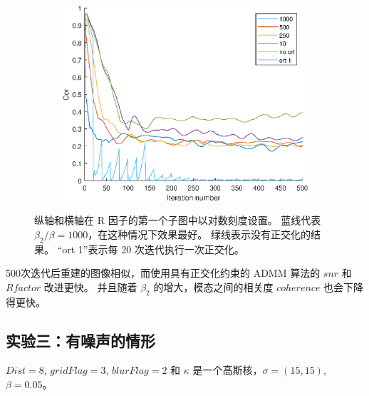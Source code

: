 \documentclass[12pt]{article}
\begin{document}
\begin{figure}[H]
\begin{subfigure}{.3\textwidth}
		\label{fig:ort_snr}
	\end{subfigure}
	\begin{subfigure}{.3\textwidth}
		\centering
		\includegraphics[width=1\linewidth]{../figures/ort_cor.eps}  
		\label{fig:ort_cor}
	\end{subfigure}
	\caption{纵轴和横轴在 R 因子的第一个子图中以对数刻度设置。 蓝线代表 $\beta_2/\beta=1000$，在这种情况下效果最好。 绿线表示没有正交化的结果。 “ort 1”表示每 20 次迭代执行一次正交化。 }
	\label{fig:ort}
\end{figure}
500次迭代后重建的图像相似，而使用具有正交化约束的 ADMM 算法的 $snr$ 和 $R factor$ 改进更快。 并且随着 $\beta_2$ 的增大，模态之间的相关度 $coherence$ 也会下降得更快。






\subsection{实验三：有噪声的情形}
$Dist=8$, $gridFlag=3$, $blurFlag=2$ 和 $\kappa$ 是一个高斯核，$\sigma = (15,15)$, $\beta=0.05$。
\end{document}
